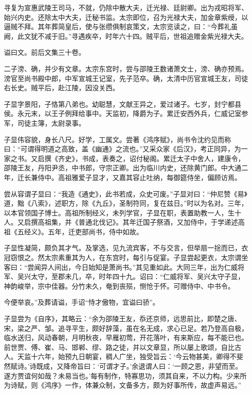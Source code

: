 \documentclass[12pt,UTF8]{ctexbook}
\begin{document}
寻复为宣惠武陵王司马，不就，仍除中散大夫，迁光禄、廷尉卿。出为戎昭将军、始兴内史。还除太中大夫，迁秘书监。太宗即位，召为光禄大夫，加金章紫绶，以逼贼不拜。其年葬简皇后，使与张缵俱制哀策文，太宗览读之，曰：“今葬礼虽阙，此文犹不减于旧。”寻遇疾卒，时年六十四。贼平后，世祖追赠金紫光禄大夫。

谥曰文。前后文集三十卷。

二子滂、确，并少有文章。太宗东宫时，尝与邵陵王数诸萧文士，滂、确亦预焉。滂官至尚书殿中郎，中军宣城王记室，先子范卒。确，太清中历官宣城王友，司徒右长史。贼平后，赴江陵，因没关西。

子显字景阳，子恪第八弟也。幼聪慧，文献王异之，爱过诸子。七岁，封宁都县侯。永元末，以王子例拜给事中。天监初，降爵为子。累迁安西外兵，仁威记室参军，司徒主簿，太尉录事。

子显伟容貌，身长八尺。好学，工属文。尝著《鸿序赋》，尚书令沈约见而称曰：“可谓得明道之高致，盖《幽通》之流也。”又采众家《后汉》，考正同异，为一家之书。又启撰《齐史》，书成，表奏之，诏付秘阁。累迁太子中舍人，建康令，邵陵王友，丹阳尹丞，中书郎，守宗正卿。出为临川内史，还除黄门郎。中大通二年，迁长兼侍中。高祖雅爱子显才，又嘉其容止吐纳，每御筵侍坐，偏顾访焉。

尝从容谓子显曰：“我造《通史》，此书若成，众史可废。”子显对曰：“仲尼赞《易》道，黜《八索》，述职方，除《九丘》，圣制符同，复在兹日。”时以为名对。三年，以本官领国子博士。高祖所制经义，未列学官，子显在职，表置助教一人，生十人。又启撰高祖集，并《普通北伐记》。其年迁国子祭酒，又加侍中，于学递述高祖《五经义》。五年，迁吏部尚书，侍中如故。

子显性凝简，颇负其才气。及掌选，见九流宾客，不与交言，但举扇一捴而已，衣冠窃恨之。然太宗素重其为人，在东宫时，每引与促宴。子显尝起更衣，太宗谓坐客曰：“尝闻异人间出，今日始知是萧尚书。”其见重如此。大同三年，出为仁威将军、吴兴太守，至郡未几，卒，时年四十九。诏曰：“仁威将军、吴兴太守子显，神韵峻举，宗中佳器。分竹未久，奄到丧殒，恻怆于怀。可赠侍中、中书令。

今便举哀。”及葬请谥，手诏“恃才傲物，宜谥曰骄”。

子显尝为《自序》，其略云：“余为邵陵王友，忝还京师，远思前比，即楚之唐、宋，梁之严、邹。追寻平生，颇好辞藻，虽在名无成，求心已足。若乃登高自极，临水送归，风动春朝，月明秋夜，早雁初莺，开花落叶，有来斯应，每不能已也。前世贾、傅、崔、马、邯郸、缪、路之徒，并以文章显，所以屡上歌颂，自比古人。天监十六年，始预九日朝宴，稠人广坐，独受旨云：‘今云物甚美，卿得不斐然赋诗。’诗既成，又降帝旨曰：‘可谓才子。’余退谓人曰：‘一顾之恩，非望而至。遂方贾谊何如哉？未易当也。’每有制作，特寡思功，须其自来，不以力构。少来所为诗赋，则《鸿序》一作，体兼众制，文备多方，颇为好事所传，故虚声易远。”
\end{document}
